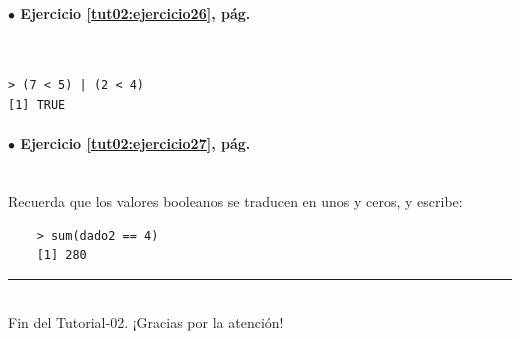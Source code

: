 \documentclass[10pt,a4paper]{article}\usepackage[]{graphicx}\usepackage[]{color}
\begin{document}
\paragraph{\bf $\bullet$ Ejercicio \ref{tut02:ejercicio26},  pág. \pageref{tut02:ejercicio26}}
\label{tut02:ejercicio26:sol}\quad\\

\begin{verbatim}
> (7 < 5) | (2 < 4)
[1] TRUE
\end{verbatim}


\paragraph{\bf $\bullet$ Ejercicio \ref{tut02:ejercicio27},  pág. \pageref{tut02:ejercicio27}}
\label{tut02:ejercicio27:sol}\quad\\

Recuerda que los valores booleanos se traducen en unos y ceros, y escribe:
\begin{verbatim}
    > sum(dado2 == 4)
    [1] 280
\end{verbatim}

\vspace{2cm} \hrule
\quad\\
Fin del Tutorial-02. ¡Gracias por la atención!
\end{document}
